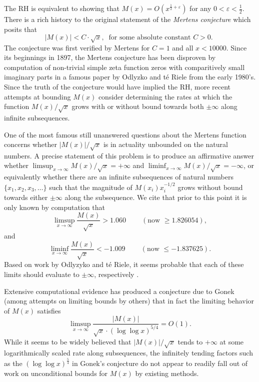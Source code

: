 \documentclass[11pt,reqno,a4letter]{article}
\numberwithin{figure}{section}
\numberwithin{table}{section}
\newcommand{\cf}{\textit{cf.\ }}
\theoremstyle{plain}
\numberwithin{theorem}{section}
\theoremstyle{definition}
\begin{document}
The RH is equivalent to showing that 
$M(x) = O\left(x^{\frac{1}{2}+\varepsilon}\right)$ for any 
$0 < \varepsilon < \frac{1}{2}$. 
There is a rich history to the original statement of the \emph{Mertens conjecture} which 
posits that 
\[ 
|M(x)| < C \cdot \sqrt{x},\ \text{ for some absolute constant $C > 0$. }
\] 
The conjecture was first verified by Mertens for $C = 1$ and all $x < 10000$. 
Since its beginnings in 1897, the Mertens conjecture has been disproven by computation 
of non-trivial simple zeta function zeros with comparitively small imaginary parts in a famous paper by 
Odlyzko and t\'{e} Riele from the early 1980's. 
Since the truth of the conjecture would have implied the RH, more recent attempts 
at bounding $M(x)$ consider determining the rates at which the function 
$M(x) / \sqrt{x}$ grows with or without bound towards both $\pm \infty$ along infinite 
subsequences. 

One of the most famous still unanswered questions about the Mertens 
function concerns whether $|M(x)| / \sqrt{x}$ is in actuality unbounded on the 
natural numbers. A precise statement of this 
problem is to produce an affirmative answer whether 
$\limsup_{x \rightarrow \infty} M(x) / \sqrt{x} = +\infty$ and 
$\liminf_{x \rightarrow \infty} M(x) / \sqrt{x} = -\infty$, or 
equivalently whether there are an infinite subsequences of natural numbers 
$\{x_1, x_2, x_3, \ldots\}$ such that the magnitude of 
$M(x_i) x_i^{-1/2}$ grows without bound towards either $\pm \infty$ 
along the subsequence. 
We cite that prior to this point it is only known by computation 
that \cite[\cf \S 4.1]{PRIMEREC} 
\[
\limsup_{x\rightarrow\infty} \frac{M(x)}{\sqrt{x}} > 1.060\ \qquad (\text{now } \geq 1.826054), 
\] 
and 
\[ 
\liminf_{x\rightarrow\infty} \frac{M(x)}{\sqrt{x}} < -1.009\ \qquad (\text{now } \leq -1.837625). 
\] 
Based on work by Odlyzyko and t\'{e} Riele, it seems probable that 
each of these limits should evaluate to $\pm \infty$, respectively 
\cite{ODLYZ-TRIELE,MREVISITED,ORDER-MERTENSFN,HURST-2017}. 

Extensive computational evidence has produced 
a conjecture due to Gonek (among attempts on limiting bounds by others) that in fact the limiting behavior of 
$M(x)$ satisfies \cite{NG-MERTENS}
$$\limsup_{x \rightarrow \infty} \frac{|M(x)|}{\sqrt{x} \cdot (\log\log x)^{5/4}} = O(1).$$ 
While it seems to be widely believed that $|M(x)| / \sqrt{x}$ tends to $+\infty$ at some 
logarithmically scaled rate along subsequences, the 
infinitely tending factors such as the $(\log\log x)^{\frac{5}{4}}$ in Gonek's conjecture 
do not appear to readily fall out of work on unconditional bounds for $M(x)$ by existing methods. 
\end{document}
